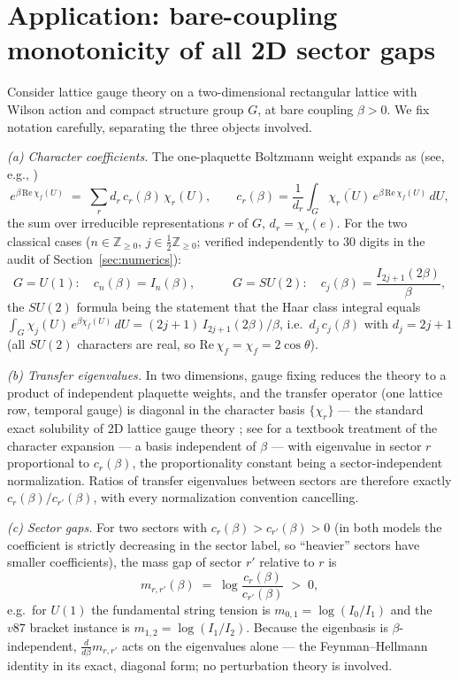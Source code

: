 \documentclass[11pt]{article}
\theoremstyle{remark}
\begin{document}
\section{Application: bare-coupling monotonicity of all 2D sector gaps}
\label{sec:ym}

Consider lattice gauge theory on a two-dimensional rectangular lattice
with Wilson action and compact structure group $G$, at bare coupling
$\beta > 0$. We fix notation carefully, separating the three objects
involved.

\emph{(a) Character coefficients.} The one-plaquette Boltzmann weight
expands as (see, e.g., \cite{Migdal, DrouffeZuber})
\[
e^{\beta\,\mathrm{Re}\,\chi_f(U)}
\;=\; \sum_r d_r\, c_r(\beta)\, \chi_r(U),
\qquad
c_r(\beta) = \frac{1}{d_r}\int_G \overline{\chi_r(U)}\,
e^{\beta\,\mathrm{Re}\,\chi_f(U)}\, dU ,
\]
the sum over irreducible representations $r$ of $G$, $d_r = \chi_r(e)$.
For the two classical cases ($n \in \mathbb{Z}_{\ge0}$,
$j \in \tfrac12\mathbb{Z}_{\ge0}$; verified independently to 30 digits
in the audit of Section~\ref{sec:numerics}):
\[
G = U(1):\quad c_n(\beta) = I_n(\beta), \qquad\quad
G = SU(2):\quad c_j(\beta) = \frac{I_{2j+1}(2\beta)}{\beta},
\]
the $SU(2)$ formula being the statement that the Haar class integral
equals $\int_G \chi_j(U)\, e^{\beta\chi_f(U)}\,dU = (2j+1)\,
I_{2j+1}(2\beta)/\beta$, i.e.\ $d_j\,c_j(\beta)$ with $d_j = 2j+1$
(all $SU(2)$ characters are real, so $\mathrm{Re}\,\chi_f = \chi_f
= 2\cos\theta$).

\emph{(b) Transfer eigenvalues.} In two dimensions, gauge fixing
reduces the theory to a product of independent plaquette weights, and
the transfer operator (one lattice row, temporal gauge) is diagonal in
the character basis $\{\chi_r\}$ --- the standard exact solubility of
2D lattice gauge theory \cite{Migdal, GrossWitten}; see
\cite{MontvayMunster} for a textbook treatment of the character
expansion --- a basis independent of $\beta$ ---
with eigenvalue in sector $r$ proportional to $c_r(\beta)$, the
proportionality constant being a sector-independent normalization.
Ratios of transfer eigenvalues between sectors are therefore exactly
$c_r(\beta)/c_{r'}(\beta)$, with every normalization convention
cancelling.

\emph{(c) Sector gaps.} For two sectors with
$c_r(\beta) > c_{r'}(\beta) > 0$ (in both models the coefficient is
strictly decreasing in the sector label, so ``heavier'' sectors have
smaller coefficients), the mass gap of sector $r'$ relative to $r$ is
\[
m_{r,r'}(\beta) \;=\; \log\frac{c_r(\beta)}{c_{r'}(\beta)} \;>\; 0,
\]
e.g.\ for $U(1)$ the fundamental string tension is
$m_{0,1} = \log(I_0/I_1)$ and the $v87$ bracket instance is
$m_{1,2} = \log(I_1/I_2)$. Because the eigenbasis is
$\beta$-independent, $\frac{d}{d\beta} m_{r,r'}$ acts on the
eigenvalues alone --- the Feynman--Hellmann identity in its exact,
diagonal form; no perturbation theory is involved.
\end{document}
